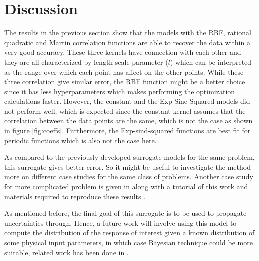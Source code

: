 \documentclass{anstrans}
\begin{document}
\section{Discussion}
The results in the previous section show that the models with the RBF, rational quadratic and Martin correlation functions are able to recover the data within a very good accuracy. 
These three kernels have connection with each other and they are all characterized by length scale parameter ($l$) which can be interpreted as the range over which each point has affect on the other points.
While these three correlation give similar error, the RBF function might be a better choice since it has less hyperparameters which makes performing the optimization calculations faster.
However, the constant and the Exp-Sine-Squared models did not perform well, which is expected since the constant kernel assumes that the correlation between the data points are the same, which is not the case as shown in figure \ref{fig:coeffs}. 
Furthermore, the Exp-sind-squared functions are best fit for periodic functions which is also not the case here.

As compared to the previously developed surrogate models for the same problem, this surrogate gives better error. So it might be useful to investigate the method more on different case studies for the same class of problems. 
Another case study for more complicated problem is given in  along with a tutorial of this work and materials required to reproduce these results \cite{RababGit}.

As mentioned before, the final goal of this surrogate is to be used to propagate uncertainties through. Hence, a future work will involve using this model to compute the distribution of the response of interest given a known distribution of some physical input parameters, in which case Bayesian technique could be more suitable, related work has been done in \cite{assessing} .

 


\end{document}

